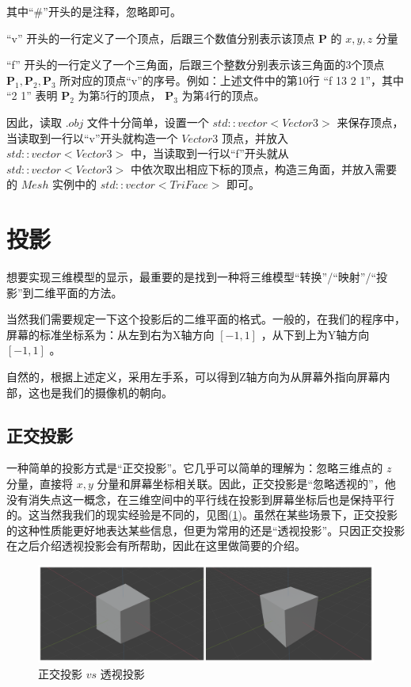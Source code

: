 \documentclass[12pt,oneside,a4paper]{ctexart}
\begin{document}
其中“\#”开头的是注释，忽略即可。

“v” 开头的一行定义了一个顶点，后跟三个数值分别表示该顶点 $\mathbf{P}$ 的 $x, y, z$ 分量

“f” 开头的一行定义了一个三角面，后跟三个整数分别表示该三角面的3个顶点 $\mathbf{P}_1, \mathbf{P}_2, \mathbf{P}_3$ 所对应的顶点“v”的序号。例如：上述文件中的第10行 “f 13 2 1”，其中 “2 1” 表明 $\mathbf{P}_2$ 为第5行的顶点， $\mathbf{P}_3$ 为第4行的顶点。

因此，读取 $.obj$ 文件十分简单，设置一个 $std::vector<Vector3>$ 来保存顶点，当读取到一行以“v”开头就构造一个 $Vector3$ 顶点，并放入 $std::vector<Vector3>$ 中，当读取到一行以“f”开头就从 $std::vector<Vector3>$ 中依次取出相应下标的顶点，构造三角面，并放入需要的 $Mesh$ 实例中的 $std::vector<TriFace>$ 即可。
\section{投影}
想要实现三维模型的显示，最重要的是找到一种将三维模型“转换”/“映射”/“投影”到二维平面的方法。

当然我们需要规定一下这个投影后的二维平面的格式。一般的，在我们的程序中，屏幕的标准坐标系为：从左到右为X轴方向 $[-1,1]$ ，从下到上为Y轴方向 $[-1,1]$ 。

自然的，根据上述定义，采用左手系，可以得到Z轴方向为从屏幕外指向屏幕内部，这也是我们的摄像机的朝向。
\subsection{正交投影}

一种简单的投影方式是“正交投影”。它几乎可以简单的理解为：忽略三维点的 $z$ 分量，直接将 $x, y$ 分量和屏幕坐标相关联。因此，正交投影是“忽略透视的”，他没有消失点这一概念，在三维空间中的平行线在投影到屏幕坐标后也是保持平行的。这当然我我们的现实经验是不同的，见图(\ref{OrthVSPers})。虽然在某些场景下，正交投影的这种性质能更好地表达某些信息，但更为常用的还是“透视投影”。只因正交投影在之后介绍透视投影会有所帮助，因此在这里做简要的介绍。
\begin{figure}[H]
	\centering
	\includegraphics[scale=0.4]{Picture/OvP.png}
	\vspace{-2ex}
	\caption{正交投影 $vs$ 透视投影}
	\label{OrthVSPers}
\end{figure}
\end{document}
